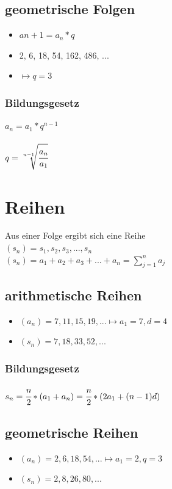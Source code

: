 \documentclass[a4paper,12pt]{scrartcl}
\begin{document}
\subsection{geometrische Folgen}
\begin{itemize}
\item $a{n+1} = a_n * q$
\item 2, 6, 18, 54, 162, 486, ...
\item $\mapsto q = 3$
\end{itemize}

\subsubsection{Bildungsgesetz}
$a_n = a_1 * q^{n - 1}$
\\ \\
$q = \sqrt[n-1]{\cfrac{a_n}{a_1}}$

\newpage
\section{Reihen}
Aus einer Folge ergibt sich eine Reihe \\
$(s_n) = s_1, s_2, s_3, ..., s_n$ \\
$(s_n) = a_1 + a_2 + a_3 + ... + a_n = \sum\limits_{j=1}^n a_j$

\subsection{arithmetische Reihen}
\begin{itemize}
\item $(a_n) = 7, 11, 15, 19, ... \mapsto a_1 = 7, d = 4$ 
\item $(s_n) = 7, 18, 33, 52, ...$
\end{itemize}

\subsubsection{Bildungsgesetz}
$s_n = \cfrac{n}{2} * (a_1 + a_n) = \cfrac{n}{2} * (2a_1 + (n - 1)d)$

\subsection{geometrische Reihen}
\begin{itemize}
\item $(a_n) = 2, 6, 18, 54, ... \mapsto a_1 = 2, q = 3$ 
\item $(s_n) = 2, 8, 26, 80, ...$
\end{itemize}
\end{document}
